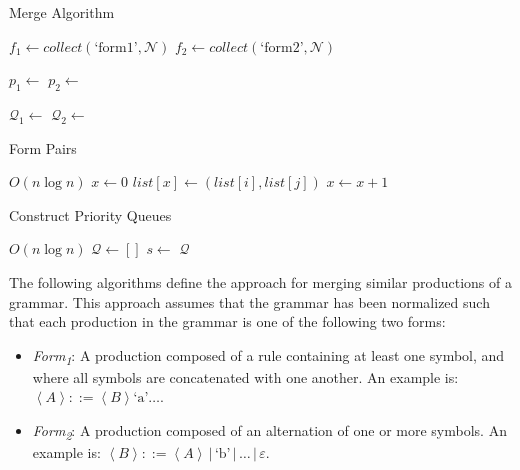 \documentclass[10pt,nocc]{xrese_report}
\begin{document}
\begin{algorithm}[tb]
 \caption{Merge Algorithm}\label{alg:merge_prods}
 \begin{algorithmic}[1]
    \State $f_1 \gets collect(\textrm{`form1'}, \mathcal{N})$
    \State $f_2 \gets collect(\textrm{`form2'}, \mathcal{N})$
    
    \State $p_1 \gets $ 
    \State $p_2 \gets $ 
    
    \State $\mathcal{Q}_1 \gets$ 
    \State $\mathcal{Q}_2 \gets$ 
    
      \State {}
      \State {}
    \EndWhile
  \EndProcedure
 \end{algorithmic}
\end{algorithm}

\begin{algorithm}[tb]
\caption{Form Pairs}\label{alg:form_pairs}
 \begin{algorithmic}[1]
  \Comment $O(n\log n)$
    \State $x \gets 0$
    \For{$i \in [0,length(list))$}
        \State $list[x] \gets (list[i], list[j])$
        \State $x \gets x + 1$
      \EndFor
    \EndFor
  \EndFunction
 \end{algorithmic}
\end{algorithm}

\begin{algorithm}[tb]
\caption{Construct Priority Queues}\label{alg:const_pq}
 \begin{algorithmic}[1]
  \Comment $O(n\log n)$
    \State $\mathcal{Q} \gets []$
      \State $s \gets $ 
        \State {}
      \EndIf
    \EndFor
    \State \Return $\mathcal{Q}$
  \EndFunction
 \end{algorithmic}
\end{algorithm}

The following algorithms define the approach for merging similar productions of a grammar. This approach assumes that the grammar has been normalized such that each production in the grammar is one of the following two forms:

\begin{itemize}
 \item \textit{Form\textsubscript{1}}: A production composed of a rule containing at least one symbol, and where all symbols are concatenated with one another. An example is: $\left<A\right> ::= \left<B\right> \textrm{`a'} \ldots$.
 \item \textit{Form\textsubscript{2}}: A production composed of an alternation of one or more symbols. An example is: $\left<B\right> ::= \left<A\right>\,|\,\textrm{`b'}\,|\,\ldots\,|\,\varepsilon$.
\end{itemize}
\end{document}
